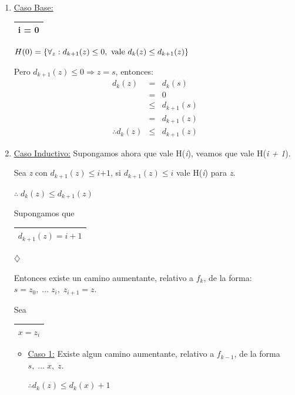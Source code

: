 \documentclass[12pt,a4paper]{report}
\begin{document}
        			\begin{enumerate}
        				\item \underline{Caso Base:} \begin{tabular}{|c|} \hline i = 0 \\\hline \end{tabular} \qquad $H(0) = \lbrace\forall_{z}: d_{k + 1}(z) \leq 0, \textup{ vale } d_{k}(z) \leq d_{k + 1}(z)  \rbrace$
        					\par Pero $d_{k + 1}(z) \leq 0 \Rightarrow z = \textit{s}$, entonces:
        					\begin{eqnarray}
        						\nonumber d_{k}(z) &=& d_{k}(s) \\
        						\nonumber &=& 0 \\
        						\nonumber &\leq & d_{k + 1}(s) \\
        						\nonumber &=& d_{k + 1}(z) \\
        						\nonumber \therefore d_{k}(z) & \leq & d_{k + 1}(z)
        					\end{eqnarray}
                \pagebreak
        				\item \underline{Caso Inductivo:} Supongamos ahora que vale H(\textit{i}), veamos que vale H(\textit{i + 1}).
        					\par Sea \textit{z} con $d_{k + 1}(z) \leq \textit{i+1}$, si $d_{k + 1}(z) \leq \textit{i}$ vale H(\textit{i}) para \textit{z}.
        					\par \begin{center} $\therefore \; d_{k}(z) \leq d_{k + 1}(z) $ \end{center}
        					\par Supongamos que \begin{tabular}{|c|} \hline $d_{k + 1}(z) = i + 1$ \\\hline \end{tabular} $\diamondsuit$
        					\par Entonces existe un camino aumentante, relativo a $f_{k}$, de la forma: $s = z_{0},  \; \dotsc \; z_{i}, \; z_{i + 1} = z$.
        					\par Sea \begin{tabular}{|c|} \hline $x = z_{i}$ \\ \hline \end{tabular}

        					\begin{itemize}
        						\item \underline{Caso 1:} Existe algun camino aumentante, relativo a $f_{k - 1}$, de la forma $s, \; \dotsc \; x, \; z$.
        							\begin{center}
        								$\therefore d_{k}(z) \leq d_{k}(x) + 1$
        							\end{center}


\end{itemize}
\end{enumerate}
\end{document}
